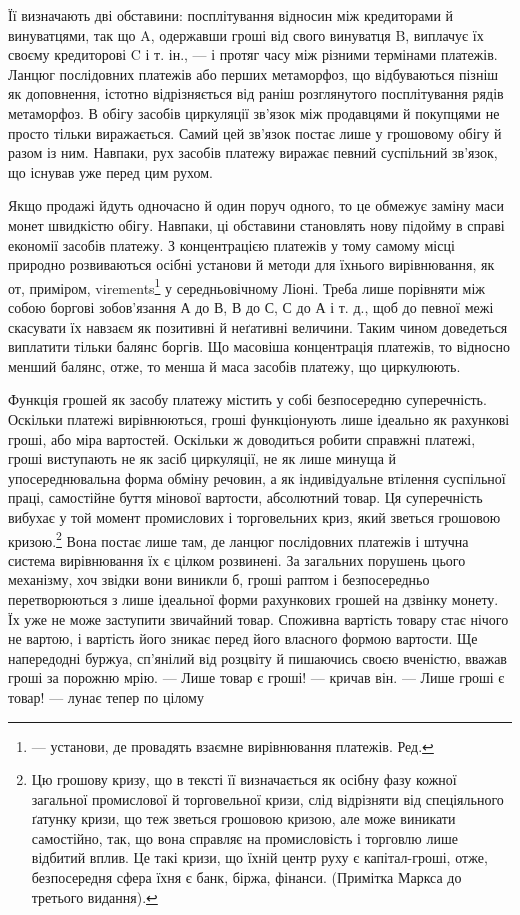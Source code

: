 \parcont{}  %
Її визначають дві обставини: посплітування відносин між кредиторами й винуватцями, так що A,
одержавши гроші від свого винуватця B, виплачує їх своєму кредиторові C і т. ін., — і протяг часу
між різними термінами платежів. Ланцюг послідовних платежів або перших метаморфоз, що відбуваються
пізніш як доповнення, істотно відрізняється від раніш розглянутого посплітування рядів метаморфоз. В
обігу засобів циркуляції зв’язок між продавцями й покупцями не просто тільки виражається. Самий цей
зв’язок постає лише у грошовому обігу й разом із ним. Навпаки, рух засобів платежу виражає певний
суспільний зв’язок, що існував уже перед цим рухом.

Якщо продажі йдуть одночасно й один поруч одного, то це обмежує заміну маси монет швидкістю обігу.
Навпаки, ці обставини становлять нову підойму в справі економії засобів платежу. З концентрацією
платежів у тому самому місці природно розвиваються осібні установи й методи для їхнього
вирівнювання, як от, приміром, virements\footnote*{
— установи, де провадять взаємне вирівнювання платежів. Ред.
} у середньовічному Ліоні. Треба лише порівняти між собою
боргові зобов’язання А до В, В до С, С до А і т. д., щоб до певної межі скасувати їх навзаєм як
позитивні й неґативні величини. Таким чином доведеться виплатити тільки балянс боргів. Що масовіша
концентрація платежів, то відносно менший балянс, отже, то менша й маса засобів платежу, що
циркулюють.

Функція грошей як засобу платежу містить у собі безпосередню суперечність. Оскільки платежі
вирівнюються, гроші функціонують лише ідеально як рахункові гроші, або міра вартостей. Оскільки ж
доводиться робити справжні платежі, гроші
виступають не як засіб циркуляції, не як лише минуща й упосереднювальна форма обміну речовин, а як
індивідуальне втілення суспільної праці, самостійне буття мінової вартости, абсолютний товар. Ця
суперечність вибухає у той момент промислових і торговельних криз, який зветься грошовою кризою.\footnote{
Цю грошову кризу, що в тексті її визначається як осібну фазу кожної загальної промислової й
торговельної кризи, слід відрізняти від спеціяльного ґатунку кризи, що теж зветься грошовою кризою,
але може виникати самостійно, так, що вона справляє на промисловість і торговлю лише відбитий вплив.
Це такі кризи, що їхній центр руху є капітал-гроші, отже, безпосередня сфера їхня є банк, біржа,
фінанси. (Примітка Маркса до третього видання).
}
Вона постає лише там, де ланцюг послідовних платежів і штучна система вирівнювання їх є цілком
розвинені. За загальних порушень цього механізму, хоч звідки вони виникли б, гроші раптом і
безпосередньо перетворюються з лише ідеальної форми рахункових грошей на дзвінку монету. Їх уже не
може заступити звичайний товар. Споживна вартість товару стає нічого не вартою, і вартість його
зникає перед його власного формою вартости. Ще напередодні буржуа, сп’янілий від розцвіту й
пишаючись своєю вченістю, вважав гроші за порожню мрію. — Лише товар є гроші! — кричав він. — Лише
гроші є товар! — лунає тепер по цілому
\parbreak{}  %
